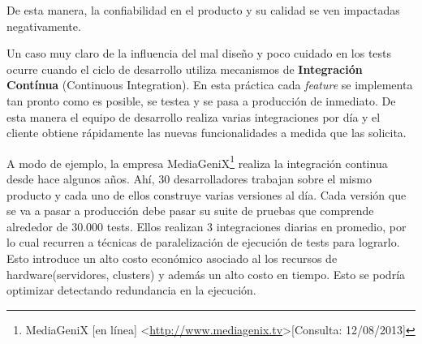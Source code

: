 \par De esta manera, la confiabilidad en el producto y su calidad se ven impactadas negativamente. 

\par Un caso muy claro de la influencia del mal diseño y poco cuidado en los tests ocurre cuando el ciclo de desarrollo utiliza mecanismos de \textbf{Integración Contínua} (Continuous Integration). En esta práctica cada \emph{feature} se implementa tan pronto como es posible, se testea y se pasa a producción de inmediato. De esta manera el equipo de desarrollo realiza varias integraciones por día y el cliente obtiene rápidamente las nuevas funcionalidades a medida que las solicita. \\

\par A modo de ejemplo, la empresa MediaGeniX\footnote{MediaGeniX [en línea] \textless\url{http://www.mediagenix.tv}\textgreater [Consulta: 12/08/2013]} realiza la integración continua desde hace algunos años. Ahí, 30 desarrolladores trabajan sobre el mismo producto y cada uno de ellos construye varias versiones al día. Cada versión que se va a pasar a producción debe pasar su suite de pruebas que comprende alrededor de 30.000 tests. Ellos realizan 3 integraciones diarias en promedio, por lo cual recurren a técnicas de paralelización de ejecución de tests para lograrlo. Esto introduce un alto costo económico asociado al los recursos de hardware(servidores, clusters) y además un alto costo en tiempo. Esto se podría optimizar detectando redundancia en la ejecución. \\

